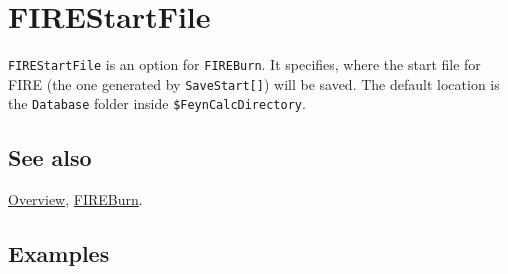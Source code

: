 \documentclass[../FeynHelpersManual.tex]{subfiles}
\begin{document}
\hypertarget{firestartfile}{
\section{FIREStartFile}\label{firestartfile}}

\texttt{FIREStartFile} is an option for \texttt{FIREBurn}. It specifies,
where the start file for FIRE (the one generated by
\texttt{SaveStart[\allowbreak{}]}) will be saved. The default location
is the \texttt{Database} folder inside \texttt{\$FeynCalcDirectory}.

\subsection{See also}

\hyperlink{toc}{Overview}, \hyperlink{fireburn}{FIREBurn}.

\subsection{Examples}
\end{document}
